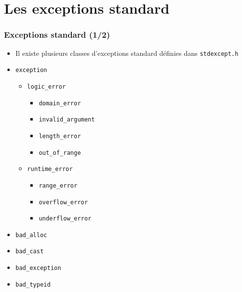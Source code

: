 \section{Les exceptions standard}

\begin{frame}
\frametitle{Exceptions standard (1/2)}
\begin{itemize}
 \item Il existe plusieurs classes d'exceptions standard définies dans \texttt{stdexcept.h}
\item \texttt{exception}
	\begin{itemize}
	\item \texttt{logic\_error}
		\begin{itemize}
		\item \texttt{domain\_error}
		\item \texttt{invalid\_argument}
		\item \texttt{length\_error}
		\item \texttt{out\_of\_range}
		\end{itemize}
	\item \texttt{runtime\_error}
		\begin{itemize}
		\item \texttt{range\_error}
		\item \texttt{overflow\_error}
		\item \texttt{underflow\_error}
		\end{itemize}
	\end{itemize}
\item \texttt{bad\_alloc}
\item \texttt{bad\_cast}
\item \texttt{bad\_exception}
\item \texttt{bad\_typeid}
\end{itemize}
\end{frame}

